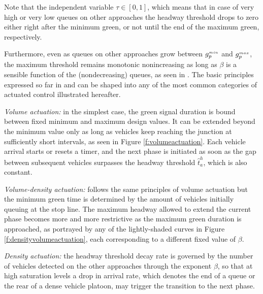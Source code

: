 Note that the independent variable $\tau \in [0,1]$, which means that in case of very high or very
low queues on other approaches the headway threshold drops to zero either right after the minimum
green, or not until the end of the maximum green, respectively.

Furthermore, even as queues on other approaches grow between $g_{p}^{\scriptscriptstyle{min}}$ and $g_{p}^{\scriptscriptstyle{max}}$, the
maximum threshold remains monotonic nonincreasing as long as $\beta$ is a sensible function of
the (nondecreasing) queues, as seen in . The basic principles expressed so far in  and  can be shaped into any of the most
common categories of actuated control illustrated hereafter.

\textit{Volume actuation:} in the simplest case, the green signal duration is bound between fixed
minimum and maximum design values. It can be extended beyond the minimum value only as
long as vehicles keep reaching the junction at sufficiently short intervals, as seen in Figure \ref{f:volumeactuation}.
Each vehicle arrival starts or resets a timer, and the next phase is initiated as soon as the gap
between subsequent vehicles surpasses the headway threshold $\hat{t}_a^{h}$, which is also constant.

\textit{Volume-density actuation:} follows the same principles of volume actuation but the
minimum green time is determined by the amount of vehicles initially queuing at the stop
line. The maximum headway allowed to extend the current phase becomes more and more restrictive as the maximum green duration is approached, as portrayed by any of the lightly-shaded curves in Figure \ref{f:densityvolumeactuation}, each corresponding to a different fixed value of $\beta$.

\textit{Density actuation:} the headway threshold decay rate is governed by the number of vehicles detected on the other approaches through the exponent $\beta$, so that at high saturation levels a drop in arrival rate, which denotes the end of a queue or the rear of a dense vehicle platoon, may trigger the transition to the next phase.

